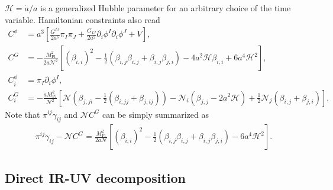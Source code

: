 \documentclass[aps, prd
, preprint
, nofootinbib 
, longbibliography
]{revtex4-1}
\newcommand{\Mpl}{M_\mathrm{Pl}}
\newcommand{\calH}{\mathcal{H}}
\newcommand{\calN}{\mathcal{N}}
\newcommand{\bae}[1]{\begin{align} #1 \end{align}}
\begin{document}
$\calH=\dot{a}/a$ is a generalized Hubble parameter for an arbitrary choice of the time variable.
Hamiltonian constraints also read
\bae{
    C^\phi&=a^3\left[\frac{G^{IJ}}{2a^6}\pi_I\pi_J+\frac{G_{IJ}}{2a^2}\partial_i\phi^I\partial_i\phi^J+V\right], \\
    C^G&=-\frac{\Mpl^2}{2a\calN^2}\left[(\beta_{i,i})^2-\frac{1}{2}(\beta_{i,j}\beta_{i,j}+\beta_{i,j}\beta_{j,i})-4a^2\calH\beta_{i,i}+6a^4\calH^2\right], \\
    C_i^\phi&=\pi_I\partial_i\phi^I, \\
    C_i^G&=-\frac{a\Mpl^2}{\calN^2}\left[\calN\left(\beta_{j,ji}-\frac{1}{2}(\beta_{i,jj}+\beta_{j,ij})\right)-\calN_i(\beta_{j,j}-2a^2\calH)+\frac{1}{2}\calN_j(\beta_{i,j}+\beta_{j,i})\right].
}
Note that $\pi^{ij}\dot{\gamma}_{ij}$ and $\calN C^G$ can be simply summarized as
\bae{
	\pi^{ij}\dot{\gamma}_{ij}-\calN C^G=\frac{\Mpl^2}{2a\calN}\left[(\beta_{i,i})^2-\frac{1}{2}(\beta_{i,j}\beta_{i,j}+\beta_{i,j}\beta_{j,i})-6a^4\calH^2\right].
}


\subsection{Direct IR-UV decomposition}
\end{document}
